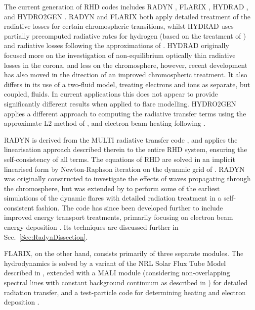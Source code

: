 The current generation of RHD codes includes RADYN \citep{Carlsson1992a,Carlsson1995,Carlsson1999, Allred2015}, FLARIX \citep{Varady2010,Heinzel2015}, HYDRAD \citep{Bradshaw2003, Bradshaw2013}, and HYDRO2GEN \citep{Druett2018,Druett2019}.
RADYN and FLARIX both apply detailed treatment of the radiative losses for certain chromospheric transitions, whilst HYDRAD uses partially precomputed radiative rates for hydrogen (based on the treatment of \citet{Sollum1999}) and radiative losses following the approximations of \citet{Carlsson2012}.
HYDRAD originally focused more on the investigation of non-equilibrium optically thin radiative losses in the corona, and less on the chromosphere, however, recent development has also moved in the direction of an improved chromospheric treatment.
It also differs in its use of a two-fluid model, treating electrons and ions as separate, but coupled, fluids.
In current applications this does not appear to provide significantly different results when applied to flare modelling.
HYDRO2GEN applies a different approach to computing the radiative transfer terms using the approximate L2 method of \citet{Ivanov1984}, and electron beam heating following \citet{Syrovatskii1972}.

RADYN is derived from the MULTI radiative transfer code \citep{Scharmer1985, Carlsson1986, Carlsson1992}, and applies the linearisation approach described therein to the entire RHD system, ensuring the self-consistency of all terms. The equations of RHD are solved in an implicit linearised form by Newton-Raphson iteration on the dynamic grid of \citet{Dorfi1987}.
RADYN was originally constructed to investigate the effects of waves propagating through the chromosphere, but was extended by \citet{Abbett1999} to perform some of the earliest simulations of the dynamic flares with detailed radiation treatment in a self-consistent fashion. The code has since been developed further to include improved energy transport treatments, primarily focusing on electron beam energy deposition \citep{Allred2005, Allred2015}.
Its techniques are discussed further in Sec.~\ref{Sec:RadynDissection}.

FLARIX, on the other hand, consists primarily of three separate modules. The hydrodynamics is solved by a variant of the NRL Solar Flux Tube Model described in \citet{Mariska1982,Mariska1989}, extended with a MALI module (considering non-overlapping spectral lines with constant background continuum as described in \citet{Rybicki1991}) for detailed radiation transfer, and a test-particle code for determining heating and electron deposition \citep{Varady2010, Heinzel2015}.

